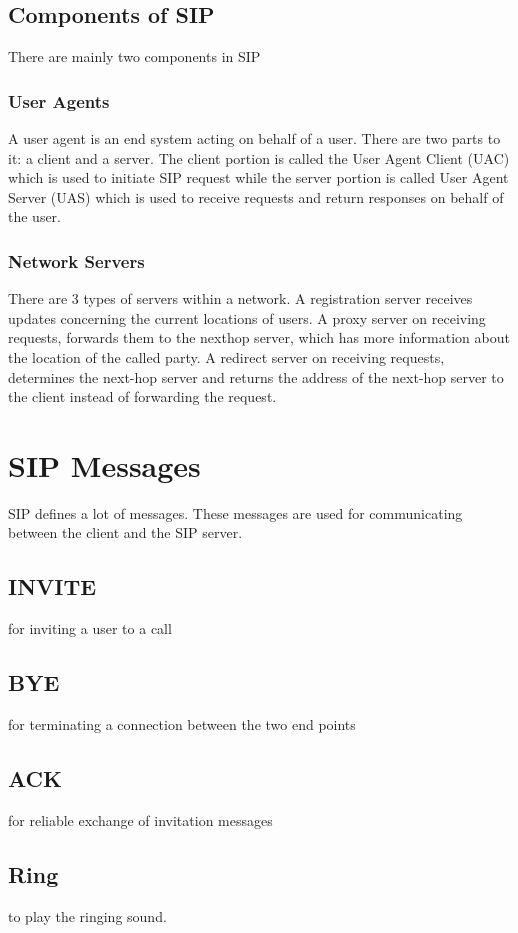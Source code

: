 \documentclass[12pt]{Book}
\begin{document}
    \newpage
    \subsection{Components of SIP}
    There are mainly two components in SIP
    \subsubsection{User Agents}
    A user agent is an end system acting on behalf of a user. There are two parts to it: a client and a
    server. The client portion is called the User Agent Client (UAC) which is used to initiate SIP
    request while the server portion is called User Agent Server (UAS) which is used to receive
    requests and return responses on behalf of the user.
    \subsubsection{Network Servers}
    There are 3 types of servers within a network. A registration server receives updates concerning
    the current locations of users. A proxy server on receiving requests, forwards them to the nexthop server, which has more information about the location of the called party. A redirect server
    on receiving requests, determines the next-hop server and returns the address of the next-hop
    server to the client instead of forwarding the request.
    \section{SIP Messages}
    SIP defines a lot of messages. These messages are used for communicating between the client and the
    SIP server.
    \subsection{INVITE} for inviting a user to a call
    \subsection{BYE}for terminating a connection between the two end points
    \subsection{ACK}for reliable exchange of invitation messages
    \subsection{Ring} to play the ringing sound.
\end{document}
